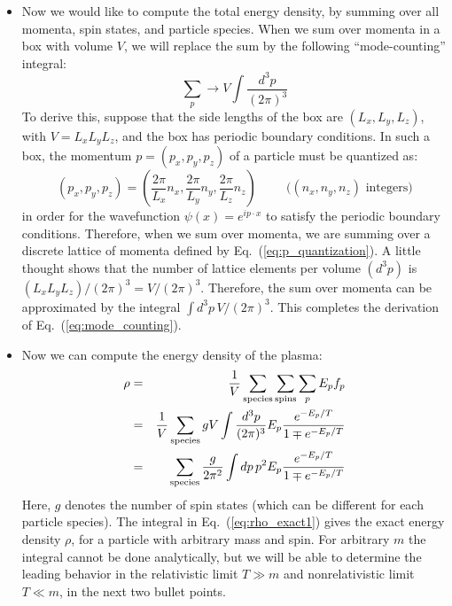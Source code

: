 \documentclass[aps,prd,superscriptaddress,groupedaddress,nofootinbib,nobibnotes]{revtex4}
\newcommand{\be}{\begin{equation}}
\newcommand{\ee}{\end{equation}}
\newcommand{\ba}{\begin{eqnarray}}
\newcommand{\ea}{\end{eqnarray}}
\newcommand{\nn}{\nonumber}
\begin{document}
\begin{itemize}
\item
Now we would like to compute the total energy density, by summing over all momenta, spin states, and particle species.
When we sum over momenta in a box with volume $V$, we will replace the sum by the following ``mode-counting'' integral:
\be
\sum_p \rightarrow V \int \frac{d^3p}{(2\pi)^3}  \label{eq:mode_counting}
\ee
To derive this, suppose that the side lengths of the box are $(L_x, L_y, L_z)$, with $V = L_x L_y L_z$,
and the box has periodic boundary conditions.
In such a box, the momentum $p = (p_x, p_y, p_z)$ of a particle must be quantized as:
\be
(p_x, p_y, p_z) = \left( \frac{2\pi}{L_x} n_x, \frac{2\pi}{L_y} n_y, \frac{2\pi}{L_z} n_z \right)  
  \hspace{1cm} \mbox{($(n_x,n_y,n_z)$ integers)} \label{eq:p_quantization}
\ee
in order for the wavefunction $\psi(x) = e^{ip\cdot x}$ to satisfy the periodic boundary conditions.
Therefore, when we sum over momenta, we are summing over a discrete lattice of momenta defined by Eq.~(\ref{eq:p_quantization}).
A little thought shows that the number of lattice elements per volume $(d^3p)$ is $(L_xL_yL_z)/(2\pi)^3 = V/(2\pi)^3$.
Therefore, the sum over momenta can be approximated by the integral $\int d^3p \, V / (2\pi)^3$.
This completes the derivation of Eq.~(\ref{eq:mode_counting}).

\item
Now we can compute the energy density of the plasma:
\ba
\rho 
  &=& \frac{1}{V} \sum_{\rm species} \sum_{\rm spins} \sum_p E_p f_p \nn \\
  &=& \frac{1}{V} \sum_{\rm species} g V \int \frac{d^3 p}{(2\pi)^3} E_p \frac{e^{-E_p/T}}{1 \mp e^{-E_p/T}} \nn \\
  &=& \sum_{\rm species} \frac{g}{2\pi^2} \int dp \, p^2 E_p \frac{e^{-E_p/T}}{1 \mp e^{-E_p/T}}  \label{eq:rho_exact1}
\ea
Here, $g$ denotes the number of spin states (which can be different for each particle species).
The integral in Eq.~(\ref{eq:rho_exact1}) gives the exact energy density $\rho$, for a particle with
arbitrary mass and spin.  For arbitrary $m$ the integral cannot be done analytically, but we will
be able to determine the leading behavior in the relativistic limit $T \gg m$ and nonrelativistic
limit $T \ll m$, in the next two bullet points.


\end{itemize}
\end{document}
